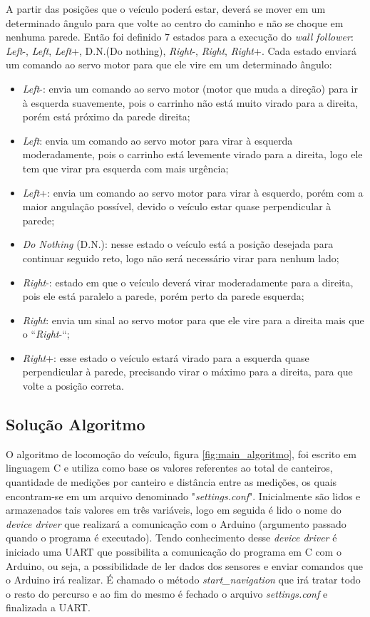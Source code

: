   A partir das posições que o veículo poderá estar, deverá se mover em um determinado ângulo para que volte ao centro do caminho e não se choque em nenhuma parede. Então foi definido 7 estados para a execução do \textit{wall follower}: \textit{Left}-, \textit{Left}, \textit{Left}+, D.N.(Do nothing), \textit{Right}-, \textit{Right}, \textit{Right}+. Cada estado enviará um comando ao servo motor para que ele vire em um determinado ângulo:
  \begin{itemize}
    \item \textit{Left}-: envia um comando ao servo motor (motor que muda a direção) para ir à esquerda suavemente, pois o carrinho não está muito virado para a direita, porém está próximo da parede direita;
    \item \textit{Left}: envia um comando ao servo motor para virar à esquerda moderadamente, pois o carrinho está levemente virado para a direita, logo ele tem que virar pra esquerda com mais urgência;
    \item \textit{Left}+: envia um comando ao servo motor para virar à esquerdo, porém com a maior angulação possível, devido o veículo estar quase perpendicular à parede;
    \item \textit{Do Nothing} (D.N.): nesse estado o veículo está a posição desejada para continuar seguido reto, logo não será necessário virar para nenhum lado;
    \item \textit{Right}-: estado em que o veículo deverá virar moderadamente para a direita, pois ele está paralelo a parede, porém perto da parede esquerda;
    \item \textit{Right}: envia um sinal ao servo motor para que ele vire para a direita mais que o “\textit{Right}-“;
    \item \textit{Right}+: esse estado o veículo estará virado para a esquerda quase perpendicular à parede, precisando virar o máximo para a direita, para que volte a posição correta.
  \end{itemize}

  \subsection{Solução Algoritmo}
  O algoritmo de locomoção do veículo, figura \ref{fig:main_algoritmo}, foi escrito em linguagem C e utiliza como base os valores referentes
  ao total de canteiros, quantidade de medições por canteiro e distância entre as medições, os quais
  encontram-se em um arquivo denominado "\textit{settings.conf}". Inicialmente são lidos e armazenados tais valores
  em três variáveis, logo em seguida é lido o nome do \textit{device driver} que realizará a comunicação com o Arduino (argumento passado quando o programa é executado). Tendo conhecimento desse \textit{device driver} é iniciado uma UART que possibilita a comunicação do programa em C com o Arduino, ou seja, a possibilidade de ler dados dos sensores e enviar comandos que o Arduino irá realizar. É chamado o método \textit{start\_navigation} que irá tratar todo o resto do percurso e ao fim do mesmo é fechado o arquivo \textit{settings.conf} e finalizada a UART.

